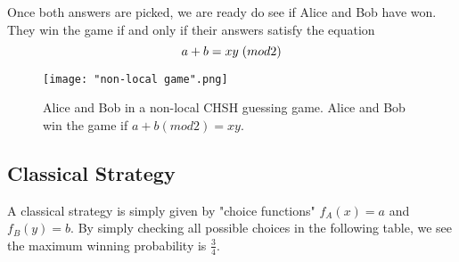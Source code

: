 Once both answers are picked, we are ready do see if Alice and Bob have won.  They win the game if and only if their answers satisfy the equation
\begin{equation*}
 a+b =xy\hspace{.1cm}(mod 2) 
\end{equation*}






\begin{figure}[h]
    \centering
    \texttt{[image: "non-local game".png]}
    \caption{Alice and Bob in a non-local CHSH guessing game. Alice and Bob win the game if $a+b (mod2)=xy$.}
    \label{fig:non-local game}
\end{figure}



\subsection{Classical Strategy}

A classical strategy is simply given by "choice functions" $f_A(x)=a$ and $f_B(y)=b$. By simply checking all possible choices in the following table, we see the maximum winning probability is $\frac{3}{4}$.


